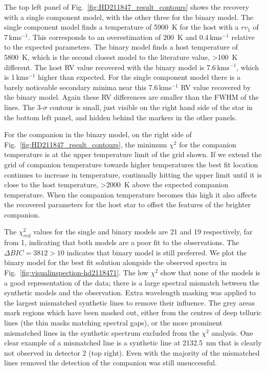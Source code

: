 \documentclass[fleqn,usenatbib]{mnras}
\newcommand{\kmps}{\,kms\(^{-1}\)}	%
\newcommand*\bl{\color{blue}}
\begin{document}
    The top left panel of Fig.~\ref{fig:HD211847_result_contours} shows the recovery with a single component model, with the other three for the binary model. The single component model finds a temperature of 5900~K for the host with a \({rv}_1\) of 7\kmps{}. This {\bl corresponds to an overestimation of 200~K and 0.4\kmps{} relative to the expected parameters}. The binary model finds a host temperature of 5800~K, which is the second closest model to the literature value, >100~K different. The host RV value recovered with the binary model is 7.6\kmps{}, which is 1\kmps{} higher than expected.  For the single component model there is a barely noticeable secondary minima near this 7.6\kmps{} RV value recovered by the binary model. Again these RV differences are smaller than the FWHM of the lines. The 3-\(\sigma\) contour is small, just visible on the right hand side of the star in the bottom left panel, and hidden behind the markers in the other panels.
    
    For the companion in the binary model, on the right side of Fig.~\ref{fig:HD211847_result_contours}, the minimum \(\chi^2\) for the companion temperature is at the upper temperature limit of the grid shown. If we extend the grid of companion temperature towards higher temperatures the best fit location continues to increase in temperature, continually hitting the upper limit until it is close to the host temperature, >2000~K above the expected companion temperature. When the companion temperature becomes this high it also affects the recovered parameters for the host star to offset the features of the brighter companion.
    
    The \(\chi^2_{red}\) values for the single and binary models are 21 and 19 respectively, far from 1, indicating that both models are a poor fit to the observations. {\bl The $\Delta BIC = 3812 >10$ indicates that binary model is still preferred.} We plot the binary model for the best fit solution alongside the observed spectra in Fig.~\ref{fig:visualinspection-hd2118471}. {\bl The low  \(\chi^2\)  show that none of the models is a good representation of the data}; there is a large spectral mismatch between the synthetic models and the observation. Extra wavelength masking was applied to the largest mismatched synthetic lines to remove their influence. The grey areas mark regions which have been masked out, either from the centres of deep telluric lines (the thin masks matching spectral gaps), or the more prominent mismatched lines in the synthetic spectrum excluded from the \(\chi^2\) analysis. One clear example of a mismatched line is a synthetic line at 2132.5~nm that is clearly not observed in detector 2 (top right). Even with the majority of the mismatched lines removed the detection of the companion was still unsuccessful.
    
\end{document}
